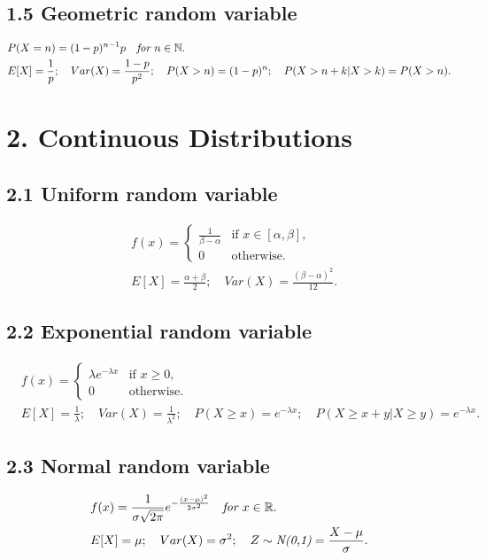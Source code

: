\documentclass{article}
\begin{document}
\subsection*{1.5 Geometric random variable}
\begin{align}
    & P(X=n) = (1-p)^{n-1}p \quad \emph{for } n \in \mathbb{N}. \nonumber \\
    & E[X] = \frac{1}{p}; \quad Var(X) = \frac{1-p}{p^2}; \quad P(X > n) = (1-p)^n ; \quad P(X>n+k|X>k) = P(X>n). \nonumber
\end{align}

\newpage
\section*{2. Continuous Distributions}
\subsection*{2.1 Uniform random variable}
\begin{align}
    & f(x) = \begin{cases}
        \frac{1}{\beta-\alpha} & \text{if $x \in [\alpha, \beta]$}, \\
        0 & \text{otherwise}.
    \end{cases} \nonumber \\
    & E[X] = \frac{\alpha+\beta}{2}; \quad Var(X) = \frac{(\beta-\alpha)^2}{12}. \nonumber
\end{align}

\subsection*{2.2 Exponential random variable}
\begin{align}
    & f(x) = \begin{cases}
        \lambda e^{-\lambda x} & \text{if $x \ge 0$}, \\
        0 & \text{otherwise}.
    \end{cases} \nonumber \\
    & E[X] = \frac{1}{\lambda}; \quad Var(X) = \frac{1}{\lambda^2}; \quad P(X\ge x) = e^{-\lambda x}; \quad P(X\ge x + y|X\ge y) = e^{-\lambda x}. \nonumber
\end{align}

\subsection*{2.3 Normal random variable}
\begin{align}
    & f(x) = \frac{1}{\sigma\sqrt{2\pi}} e^{-\frac{(x-\mu)^2}{2\sigma^2}} \quad \emph{for $x\in \mathbb{R}$}. \nonumber \\
    & E[X] = \mu; \quad Var(X) = \sigma^2; \quad Z \sim \emph{N(0,1)} = \frac{X-\mu}{\sigma}. \nonumber
\end{align}
\end{document}
